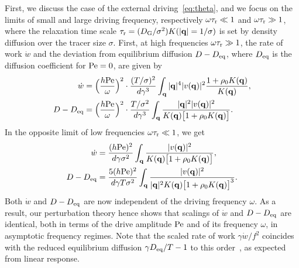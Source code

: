 \documentclass[superscriptaddress, twocolumn, prx, longbibliography, nofootinbib]{revtex4-1}
\begin{document}
First, we discuss the case of the external driving~\eqref{eq:theta}, and we focus on the limits of small and large driving frequency, respectively $\omega\tau_{\rm r}\ll 1$ and $\omega\tau_{\rm r}\gg 1$, where the relaxation time scale $\tau_{\rm r}=(D_{\rm G}/\sigma^2)K(|{\bf q}|=1/\sigma)$ is set by density diffusion over the tracer size $\sigma$. First, at high frequencies $\omega\tau_{\rm r}\gg 1$, the rate of work $\dot w$ and the deviation from equilibrium diffusion $D-D_{\rm eq}$, where $D_{\rm eq}$ is the diffusion coefficient for ${\rm Pe}=0$, are given by
\begin{equation}\label{eq:large}
	\begin{aligned}
		\dot w &= \Big(\frac{h{\rm Pe}}{\omega}\Big)^2 \cdot \frac{(T/\sigma)^2}{d\gamma^3} \int_{\bf q} |{\bf q}|^4 |v({\bf q})|^2 \frac{1 + \rho_0K({\bf q})}{K({\bf q})} ,
		\\
		D-D_{\rm eq} &= \Big(\frac{h{\rm Pe}}{\omega}\Big)^2 \cdot \frac{T /\sigma^2}{d\gamma^3} \int_{\bf q}\frac{|{\bf q}|^2 |v({\bf q})|^2 } {K({\bf q})\big[1 + \rho_0 K({\bf q})\big]} .
	\end{aligned}
\end{equation}
In the opposite limit of low frequencies $\omega\tau_{\rm r}\ll 1$, we get
\begin{equation}\label{eq:small}
	\begin{aligned}
		\dot w &= \frac{(h{\rm Pe})^2}{d\gamma\sigma^2} \int_{\bf q} \frac{|v({\bf q})|^2}{K({\bf q})\big[1 + \rho_0K({\bf q})\big]} ,
		\\
		D - D_{\rm eq} &= \frac{5(h{\rm Pe})^2}{d\gamma T\sigma^2} \int_{\bf q} \frac{|v({\bf q})|^2}{|{\bf q}|^2K({\bf q})\big[1 + \rho_0K({\bf q})\big]^3} .
	\end{aligned}
\end{equation}
Both $\dot w$ and $D-D_{\rm eq}$ are now independent of the driving frequency $\omega$. As a result, our perturbation theory hence shows that scalings of $\dot w$ and $D-D_{\rm eq}$ are identical, both in terms of the drive amplitude $\rm Pe$ and of its frequency $\omega$, in asymptotic frequency regimes. Note that the scaled rate of work $\gamma\dot w/f^2$ coincides with the reduced equilibrium diffusion $\gamma D_{\rm eq}/T-1$ to this order~\cite{Demery2011, Demery2014}, as expected from linear response.
\end{document}
